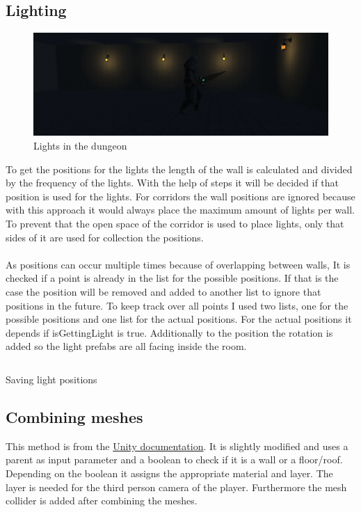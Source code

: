 \documentclass[a4paper,11pt,oneside]{scrreprt}
\begin{document}
\newpage
\subsection{Lighting}
\label{subsection:lighting}
\begin{figure}[htb]
	\centering
	\includegraphics[scale=0.45]{images/lights.png}   
	\caption{Lights in the dungeon}
	\label{fig:lights}
\end{figure}
To get the positions for the lights the length of the wall is calculated and divided by the frequency of the lights. With the help of steps it will be decided if that position is used for the lights. For corridors the wall positions are ignored because with this approach it would always place the maximum amount of lights per wall. To prevent that the open space of the corridor is used to place lights, only that sides of it are used for collection the positions.
\\
\\
As positions can occur multiple times because of overlapping between walls, It is checked if a point is already in the list for the possible positions. If that is the case the position will be removed and added to another list to ignore that positions in the future. To keep track over all points I used two lists, one for the possible positions and one list for the actual positions. For the actual positions it depends if isGettingLight is true. Additionally to the position the rotation is added so the light prefabs are all facing inside the room. 
\begin{listing}[ht]
    \inputminted[fontsize=\footnotesize,linenos]{csharp}{code/Lights2.cs}
    \caption[Saving light positions]{Saving light positions}
    \label{code:saving-light-positions}
\end{listing}

\newpage
\subsection{Combining meshes}
\label{subsection:combining-meshes}
This method is from the \href{https://docs.unity3d.com/ScriptReference/Mesh.CombineMeshes.html}{Unity documentation}. It is slightly modified and uses a parent as input parameter and a boolean to check if it is a wall or a floor/roof. 
\\
Depending on the boolean it assigns the appropriate material and layer. The layer is needed for the third person camera of the player. Furthermore the mesh collider is added after combining the meshes.
\end{document}
